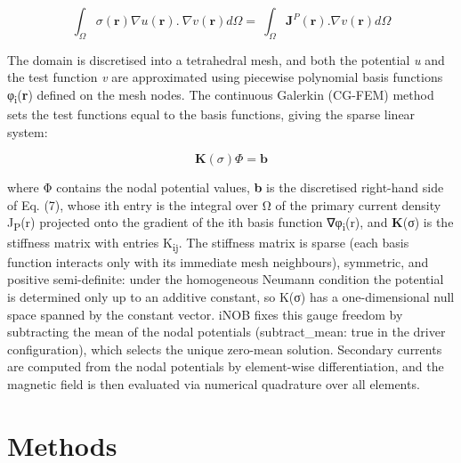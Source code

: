 \documentclass[11pt]{article}
\begin{document}
\begin{equation}
\int_{\Omega}^{}{\sigma\left( \mathbf{r} \right)\nabla u\left( \mathbf{r} \right).\ \nabla v\left( \mathbf{r} \right)d\Omega = \ \int_{\Omega}^{}{\mathbf{J}^{P}\left( \mathbf{r} \right).\nabla v\left( \mathbf{r} \right)d\Omega}}
\tag{7}
\end{equation}

The domain is discretised into a tetrahedral mesh, and both the
potential \emph{u} and the test function \emph{v} are approximated using
piecewise polynomial basis functions φ\textsubscript{i}(\textbf{r})
defined on the mesh nodes. The continuous Galerkin (CG-FEM) method sets
the test functions equal to the basis functions, giving the sparse
linear system:

\begin{equation}
\mathbf{K}(\sigma)\Phi = \mathbf{b}
\tag{8}
\end{equation}

where Φ contains the nodal potential values, \textbf{b} is the
discretised right-hand side of Eq. (7), whose ith entry is the integral
over Ω of the primary current density J\textsubscript{P}(r) projected
onto the gradient of the ith basis function ∇φ\textsubscript{i}(r), and
\textbf{K}(σ) is the stiffness matrix with entries K\textsubscript{ij}.
The stiffness matrix is sparse (each basis function interacts only with
its immediate mesh neighbours), symmetric, and positive semi-definite:
under the homogeneous Neumann condition the potential is determined only
up to an additive constant, so K(σ) has a one-dimensional null space
spanned by the constant vector. iNOB fixes this gauge freedom by
subtracting the mean of the nodal potentials (subtract\_mean: true in
the driver configuration), which selects the unique zero-mean solution.
Secondary currents are computed from the nodal potentials by
element-wise differentiation, and the magnetic field is then evaluated
via numerical quadrature over all elements.

\section{Methods}\label{methods}
\end{document}
